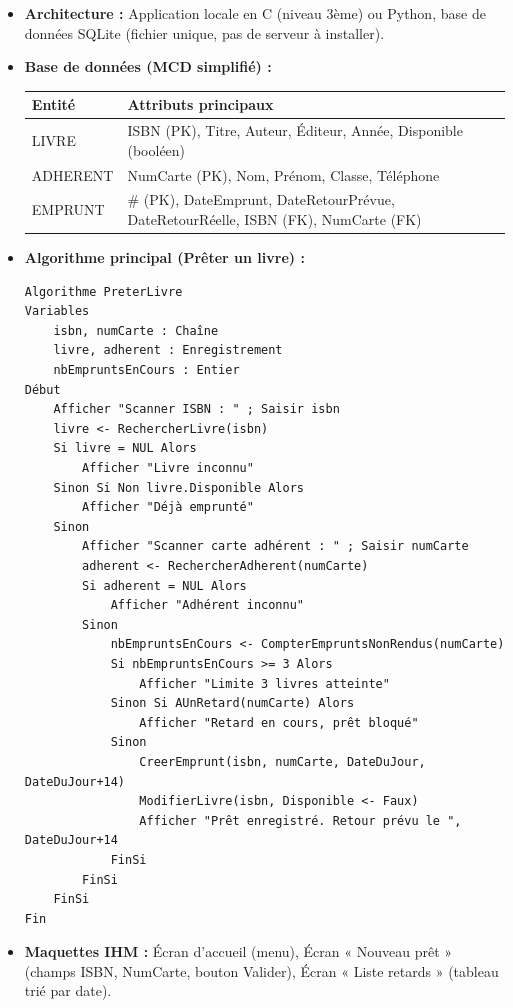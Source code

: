 \documentclass[11pt]{article}
\begin{document}
\begin{exemplebox}
\begin{itemize}
    \item \textbf{Architecture :} Application locale en C (niveau 3ème) ou Python, base de données SQLite (fichier unique, pas de serveur à installer).
    \item \textbf{Base de données (MCD simplifié) :}
        \begin{center}
            \begin{tabularx}{\linewidth}{|l|X|}\hline
            \rowcolor{popblue}\textbf{Entité} & \textbf{Attributs principaux} \\\hline
            LIVRE & ISBN (PK), Titre, Auteur, Éditeur, Année, Disponible (booléen) \\\hline
            ADHERENT & NumCarte (PK), Nom, Prénom, Classe, Téléphone \\\hline
            EMPRUNT & \# (PK), DateEmprunt, DateRetourPrévue, DateRetourRéelle, ISBN (FK), NumCarte (FK) \\\hline
            \end{tabularx}
        \end{center}
    \item \textbf{Algorithme principal (Prêter un livre) :}
        \begin{lstlisting}
Algorithme PreterLivre
Variables
    isbn, numCarte : Chaîne
    livre, adherent : Enregistrement
    nbEmpruntsEnCours : Entier
Début
    Afficher "Scanner ISBN : " ; Saisir isbn
    livre <- RechercherLivre(isbn)
    Si livre = NUL Alors
        Afficher "Livre inconnu"
    Sinon Si Non livre.Disponible Alors
        Afficher "Déjà emprunté"
    Sinon
        Afficher "Scanner carte adhérent : " ; Saisir numCarte
        adherent <- RechercherAdherent(numCarte)
        Si adherent = NUL Alors
            Afficher "Adhérent inconnu"
        Sinon
            nbEmpruntsEnCours <- CompterEmpruntsNonRendus(numCarte)
            Si nbEmpruntsEnCours >= 3 Alors
                Afficher "Limite 3 livres atteinte"
            Sinon Si AUnRetard(numCarte) Alors
                Afficher "Retard en cours, prêt bloqué"
            Sinon
                CreerEmprunt(isbn, numCarte, DateDuJour, DateDuJour+14)
                ModifierLivre(isbn, Disponible <- Faux)
                Afficher "Prêt enregistré. Retour prévu le ", DateDuJour+14
            FinSi
        FinSi
    FinSi
Fin
        \end{lstlisting}
    \item \textbf{Maquettes IHM :} Écran d'accueil (menu), Écran « Nouveau prêt » (champs ISBN, NumCarte, bouton Valider), Écran « Liste retards » (tableau trié par date).
\end{itemize}
\end{exemplebox}
\end{document}
